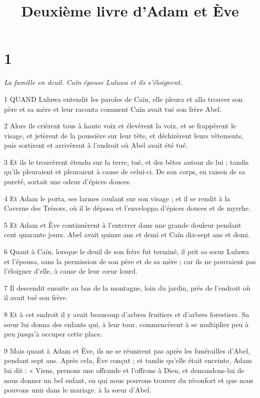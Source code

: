 

\title{Deuxième livre d'Adam et Ève}

\chapter{1}

\par \textit{La famille en deuil. Caïn épouse Luluwa et ils s'éloignent.}

\par 1 QUAND Luluwa entendit les paroles de Caïn, elle pleura et alla trouver son père et sa mère et leur raconta comment Caïn avait tué son frère Abel.

\par 2 Alors ils crièrent tous à haute voix et élevèrent la voix, et se frappèrent le visage, et jetèrent de la poussière sur leur tête, et déchirèrent leurs vêtements, puis sortirent et arrivèrent à l'endroit où Abel avait été tué.

\par 3 Et ils le trouvèrent étendu sur la terre, tué, et des bêtes autour de lui ; tandis qu'ils pleuraient et pleuraient à cause de celui-ci. De son corps, en raison de sa pureté, sortait une odeur d'épices douces.

\par 4 Et Adam le porta, ses larmes coulant sur son visage ; et il se rendit à la Caverne des Trésors, où il le déposa et l'enveloppa d'épices douces et de myrrhe.

\par 5 Et Adam et Ève continuèrent à l'enterrer dans une grande douleur pendant cent quarante jours. Abel avait quinze ans et demi et Caïn dix-sept ans et demi.

\par 6 Quant à Caïn, lorsque le deuil de son frère fut terminé, il prit sa sœur Luluwa et l'épousa, sans la permission de son père et de sa mère ; car ils ne pouvaient pas l'éloigner d'elle, à cause de leur cœur lourd.

\par 7 Il descendit ensuite au bas de la montagne, loin du jardin, près de l'endroit où il avait tué son frère.

\par 8 Et à cet endroit il y avait beaucoup d'arbres fruitiers et d'arbres forestiers. Sa sœur lui donna des enfants qui, à leur tour, commencèrent à se multiplier peu à peu jusqu'à occuper cette place.

\par 9 Mais quant à Adam et Ève, ils ne se réunirent pas après les funérailles d'Abel, pendant sept ans. Après cela, Ève conçut ; et tandis qu'elle était enceinte, Adam lui dit : « Viens, prenons une offrande et l'offrons à Dieu, et demandons-lui de nous donner un bel enfant, en qui nous pouvons trouver du réconfort et que nous pouvons unir dans le mariage. à la sœur d'Abel.

